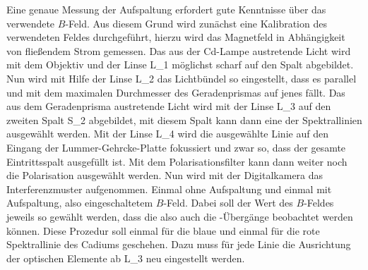 Eine genaue Messung der Aufspaltung erfordert gute Kenntnisse über das verwendete $B$-Feld.
Aus diesem Grund wird zunächst eine Kalibration des verwendeten Feldes durchgeführt, hierzu wird das
Magnetfeld in Abhängigkeit von fließendem Strom gemessen. 
Das aus der Cd-Lampe austretende Licht wird mit dem Objektiv und der Linse L_1 möglichst
scharf auf den Spalt abgebildet.
Nun wird mit Hilfe der Linse L_2 das Lichtbündel so eingestellt, dass es parallel und mit dem maximalen
Durchmesser des Geradenprismas auf jenes fällt. Das aus dem Geradenprisma austretende Licht wird mit der 
Linse L_3 auf den zweiten Spalt S_2 abgebildet, mit diesem Spalt kann dann eine der Spektrallinien
ausgewählt werden. Mit der Linse L_4 wird die ausgewählte Linie auf den Eingang der Lummer-Gehrcke-Platte
fokussiert und zwar so, dass der gesamte Eintrittsspalt ausgefüllt ist. 
Mit dem Polarisationsfilter kann dann weiter noch die Polarisation ausgewählt werden. Nun wird 
mit der Digitalkamera das Interferenzmuster aufgenommen. Einmal ohne Aufspaltung und einmal 
mit Aufspaltung, also eingeschaltetem $B$-Feld. Dabei soll der Wert des $B$-Feldes jeweils so
gewählt werden, dass die \pi also auch die \sigma-Übergänge beobachtet werden können.
Diese Prozedur soll einmal für die blaue und einmal für die rote Spektrallinie des Cadiums geschehen.
Dazu muss für jede Linie die Ausrichtung der optischen Elemente ab L_3 neu eingestellt werden.
\FloatBarrier